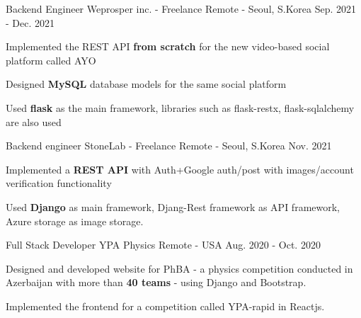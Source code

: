 

\begin{cventries}

  \cventry
    {Backend Engineer} %
    {Weprosper inc. - Freelance} %
    {Remote - Seoul, S.Korea} %
    {Sep. 2021 - Dec. 2021} %
    {
      \begin{cvitems} %
        \item {Implemented the REST API \textbf{from scratch} for the new video-based social platform called AYO}
        \item {Designed \textbf{MySQL} database models for the same social platform}
        \item {Used \textbf{flask} as the main framework, libraries such as flask-restx, flask-sqlalchemy are also used}
      \end{cvitems}
    }
  \cventry
    {Backend engineer} %
    {StoneLab - Freelance} %
    {Remote - Seoul, S.Korea} %
    {Nov. 2021} %
    {
      \begin{cvitems} %
        \item {Implemented a \textbf{REST API} with Auth+Google auth/post with images/account verification functionality}
        \item {Used \textbf{Django} as main framework, Djang-Rest framework as API framework, Azure storage as image storage.}
      \end{cvitems}
    }
  \cventry
    {Full Stack Developer} %
    {YPA Physics} %
    {Remote - USA} %
    {Aug. 2020 - Oct. 2020} %
    {
      \begin{cvitems} %
        \item {Designed and developed website for PhBA - a physics competition conducted in Azerbaijan with more than \textbf{40 teams} - using Django and Bootstrap.}
        \item {Implemented the frontend for a competition called YPA-rapid in Reactjs.}
      \end{cvitems}
    }
\end{cventries}
